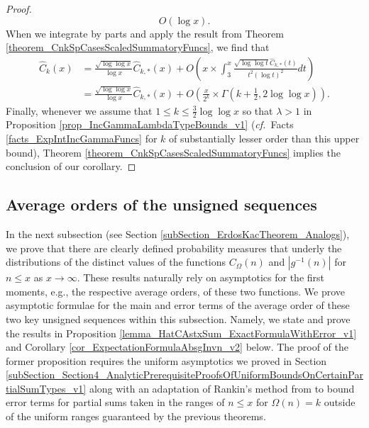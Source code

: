 \documentclass[11pt,reqno,a4letter]{article}
\numberwithin{figure}{section}
\numberwithin{table}{section}
\newcommand{\cf}{\textit{cf.\ }}
\theoremstyle{plain}
\numberwithin{theorem}{section}
\theoremstyle{definition}
\begin{document}
\begin{proof}
\[     O(\log x). 
\]
When we integrate by parts and apply the result from 
Theorem \ref{theorem_CnkSpCasesScaledSummatoryFuncs}, we find that 
\begin{align*}
\widehat{C}_k(x) & = \frac{\sqrt{\log\log x}}{\log x} \widehat{C}_{k,\ast}(x) + 
     O\left(x \times \int_3^x \frac{\sqrt{\log\log t} \widehat{C}_{k,\ast}(t)}{t^2 (\log t)^2} dt\right) \\ 
     & = \frac{\sqrt{\log\log x}}{\log x} \widehat{C}_{k,\ast}(x) + 
     O\left(\frac{x}{2^k} \times \Gamma\left(k+\frac{1}{2}, 2\log\log x\right)\right). 
\end{align*} 
Finally, whenever we assume that $1 \leq k \leq \frac{3}{2} \log\log x$ so that $\lambda > 1$ in 
Proposition \ref{prop_IncGammaLambdaTypeBounds_v1} 
(\cf Facts \ref{facts_ExpIntIncGammaFuncs} for $k$ of substantially lesser order than this upper bound), 
Theorem \ref{theorem_CnkSpCasesScaledSummatoryFuncs} 
implies the conclusion of our corollary. 
\end{proof}

\subsection{Average orders of the unsigned sequences}
\label{subSection_AvgOrdersOfTheUnsignedSequences} 

In the next subsection 
(see Section \ref{subSection_ErdosKacTheorem_Analogs}), 
we prove that there are clearly defined 
probability measures that underly the distributions of the distinct values of 
the functions $C_{\Omega}(n)$ and $|g^{-1}(n)|$ for $n \leq x$ as $x \rightarrow \infty$. 
These results naturally rely on asymptotics for the first moments, e.g., the 
respective average orders, of these two functions. 
We prove asymptotic formulae for the main and error terms of the average order of these 
two key unsigned sequences within this subsection. 
Namely, we state and prove the results in 
Proposition \ref{lemma_HatCAstxSum_ExactFormulaWithError_v1} and 
Corollary \ref{cor_ExpectationFormulaAbsgInvn_v2} below. 
The proof of the former proposition requires the uniform asymptotics we proved in 
Section \ref{subSection_Section4_AnalyticPrerequisiteProofsOfUniformBoundsOnCertainPartialSumTypes_v1} 
along with an adaptation of Rankin's method from \cite[\S 7.4]{MV} to 
bound error terms for partial sums taken in the ranges of $n \leq x$ for $\Omega(n) = k$ 
outside of the uniform ranges guaranteed by the previous theorems. 
\end{document}
